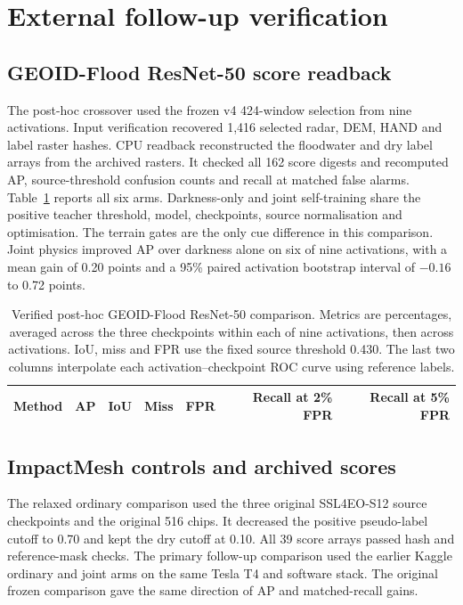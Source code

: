 \section{External follow-up verification}

\subsection{GEOID-Flood ResNet-50 score readback}
The post-hoc crossover used the frozen v4 424-window selection from nine activations. Input verification recovered 1,416 selected radar, DEM, HAND and label raster hashes. CPU readback reconstructed the floodwater and dry label arrays from the archived rasters. It checked all 162 score digests and recomputed AP, source-threshold confusion counts and recall at matched false alarms. Table~\ref{tab:geoid_resnet_all} reports all six arms. Darkness-only and joint self-training share the positive teacher threshold, model, checkpoints, source normalisation and optimisation. The terrain gates are the only cue difference in this comparison. Joint physics improved AP over darkness alone on six of nine activations, with a mean gain of 0.20 points and a 95\% paired activation bootstrap interval of $-0.16$ to 0.72 points.

\begin{table}[pos=t]
\centering
\caption{Verified post-hoc GEOID-Flood ResNet-50 comparison. Metrics are percentages, averaged across the three checkpoints within each of nine activations, then across activations. IoU, miss and FPR use the fixed source threshold 0.430. The last two columns interpolate each activation--checkpoint ROC curve using reference labels.}
\label{tab:geoid_resnet_all}
\begin{tabular}{@{}lrrrrrr@{}}
\toprule
Method & AP & IoU & Miss & FPR & Recall at 2\% FPR & Recall at 5\% FPR \\
\midrule

\end{tabular}
\end{table}

\subsection{ImpactMesh controls and archived scores}
The relaxed ordinary comparison used the three original SSL4EO-S12 source checkpoints and the original 516 chips. It decreased the positive pseudo-label cutoff to 0.70 and kept the dry cutoff at 0.10. All 39 score arrays passed hash and reference-mask checks. The primary follow-up comparison used the earlier Kaggle ordinary and joint arms on the same Tesla T4 and software stack. The original frozen comparison gave the same direction of AP and matched-recall gains.

